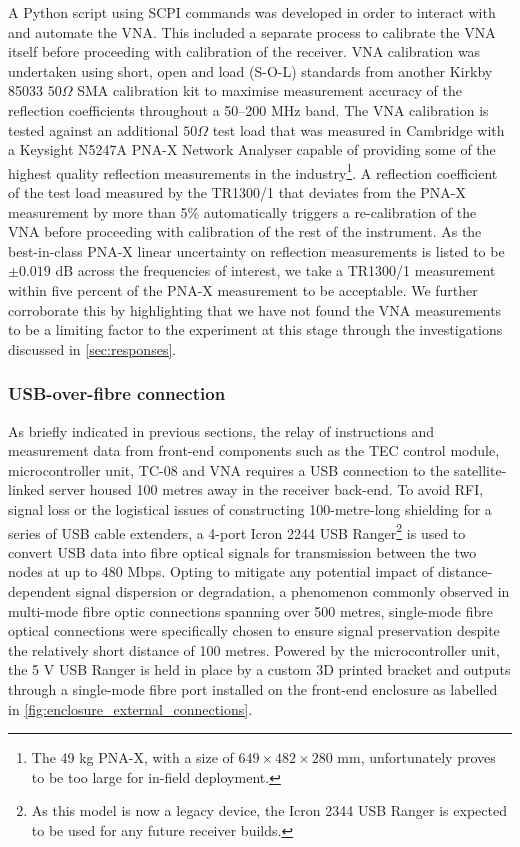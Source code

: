 A Python script using SCPI commands was developed in order to interact with and automate the VNA. This included a separate process to calibrate the VNA itself before proceeding with calibration of the receiver. VNA calibration was undertaken using short, open and load (S-O-L) standards from another Kirkby 85033 $50 \Omega$ SMA calibration kit to maximise measurement accuracy of the reflection coefficients throughout a 50--200 MHz band. The VNA calibration is tested against an additional $50 \Omega$ test load that was measured in Cambridge with a Keysight N5247A PNA-X Network Analyser capable of providing some of the highest quality reflection measurements in the industry\footnote{The 49 kg PNA-X, with a size of $649 \times 482 \times 280$ mm, unfortunately proves to be too large for in-field deployment.}. A reflection coefficient of the test load measured by the TR1300/1 that deviates from the PNA-X measurement by more than 5\% automatically triggers a re-calibration of the VNA before proceeding with calibration of the rest of the instrument. As the best-in-class PNA-X linear uncertainty on reflection measurements is listed to be $\pm 0.019$ dB across the frequencies of interest, we take a TR1300/1 measurement within five percent of the PNA-X measurement to be acceptable. We further corroborate this by highlighting that we have not found the VNA measurements to be a limiting factor to the experiment at this stage through the investigations discussed in \cref{sec:responses}.


\subsubsection{USB-over-fibre connection}
As briefly indicated in previous sections, the relay of instructions and measurement data from front-end components such as the TEC control module, microcontroller unit, TC-08 and VNA requires a USB connection to the satellite-linked server housed 100 metres away in the receiver back-end. To avoid RFI, signal loss or the logistical issues of constructing 100-metre-long shielding for a series of USB cable extenders, a 4-port Icron 2244 USB Ranger\footnote{As this model is now a legacy device, the Icron 2344 USB Ranger is expected to be used for any future receiver builds.} is used to convert USB data into fibre optical signals for transmission between the two nodes at up to 480 Mbps. Opting to mitigate any potential impact of distance-dependent signal dispersion or degradation, a phenomenon commonly observed in multi-mode fibre optic connections spanning over 500 metres, single-mode fibre optical connections were specifically chosen to ensure signal preservation despite the relatively short distance of 100 metres. Powered by the microcontroller unit, the 5 V USB Ranger is held in place by a custom 3D printed bracket and outputs through a single-mode fibre port installed on the front-end enclosure as labelled in \cref{fig:enclosure_external_connections}.


